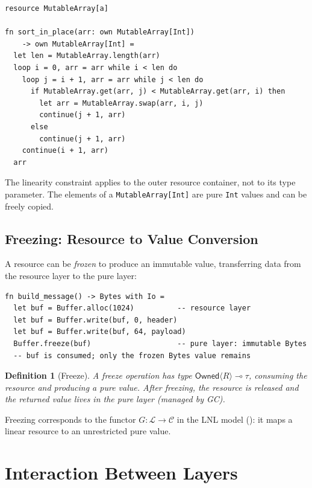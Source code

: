 \documentclass[11pt]{article}
\newtheorem{definition}[theorem]{Definition}
\newcommand{\Owned}[1]{\mathsf{Owned}\langle #1 \rangle}
\newcommand{\lolli}{\multimap}
\begin{document}
\begin{lstlisting}[caption={Parametric resource types},label={lst:parametric-resource}]
resource MutableArray[a]

fn sort_in_place(arr: own MutableArray[Int])
    -> own MutableArray[Int] =
  let len = MutableArray.length(arr)
  loop i = 0, arr = arr while i < len do
    loop j = i + 1, arr = arr while j < len do
      if MutableArray.get(arr, j) < MutableArray.get(arr, i) then
        let arr = MutableArray.swap(arr, i, j)
        continue(j + 1, arr)
      else
        continue(j + 1, arr)
    continue(i + 1, arr)
  arr
\end{lstlisting}

The linearity constraint applies to the outer resource container, not
to its type parameter.  The elements of a \texttt{MutableArray[Int]}
are pure \texttt{Int} values and can be freely copied.

\subsection{Freezing: Resource to Value Conversion}\label{sec:freezing}

A resource can be \emph{frozen} to produce an immutable value,
transferring data from the resource layer to the pure layer:

\begin{lstlisting}[caption={Freezing a buffer into immutable bytes},label={lst:freeze}]
fn build_message() -> Bytes with Io =
  let buf = Buffer.alloc(1024)          -- resource layer
  let buf = Buffer.write(buf, 0, header)
  let buf = Buffer.write(buf, 64, payload)
  Buffer.freeze(buf)                    -- pure layer: immutable Bytes
  -- buf is consumed; only the frozen Bytes value remains
\end{lstlisting}

\begin{definition}[Freeze]\label{def:freeze}
A \emph{freeze} operation has type $\Owned{R} \lolli \tau$, consuming
the resource and producing a pure value.  After freezing, the resource
is released and the returned value lives in the pure layer (managed
by GC).
\end{definition}

Freezing corresponds to the functor $G : \mathcal{L} \to \mathcal{C}$
in the LNL model (): it maps a linear resource to an
unrestricted pure value.


\section{Interaction Between Layers}\label{sec:interaction}
\end{document}
